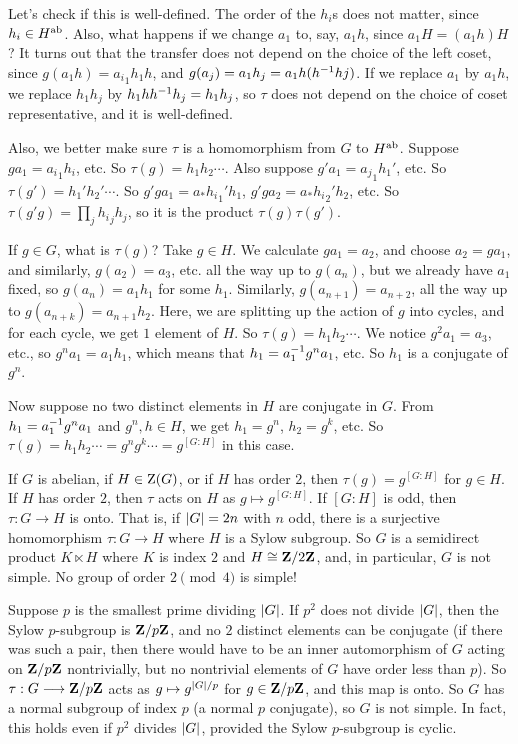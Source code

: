\documentclass[11pt, oneside]{amsart}
\begin{document}
Let's check if this is well-defined. The order of the $h_i$s does not matter, since $h_i\in H\textsuperscript{ab}$. Also, what happens if we change $a_1$ to, say, $a_1h$, since $a_1H = (a_1h)H$? It turns out that the transfer does not depend on the choice of the left coset, since $g(a_1h) = {a_i}_1 h_1h$, and $g(a_j) = a_1 h_j = a_1h(h^{-1} hj)$. If we replace $a_1$ by $a_1h$, we replace $h_1h_j$ by $h_1hh^{-1} h_j = h_1h_j$, so $\tau$ does not depend on the choice of coset representative, and it is well-defined.

Also, we better make sure $\tau$ is a homomorphism from $G$ to $H\textsuperscript{ab}$. Suppose $ga_1 = {a_i}_1h_i$, etc. So $\tau(g) = h_1h_2\cdots$. Also suppose $g'a_1 = {a_j}_1h_1'$, etc. So $\tau(g') = h_1'h_2'\cdots$. So $g'ga_1 = a_* {h_i}_1' h_1$, $g'ga_2 = a_* {h_i}_2' h_2$, etc. So $\tau(g'g)= \prod_j {h_i}_j h_j$, so it is the product $\tau(g)\tau(g')$.

If $g\in G$, what is $\tau(g)$? Take $g\in H$. We calculate $ga_1=a_2$, and choose $a_2 =ga_1$, and similarly, $g(a_2) = a_3$, etc. all the way up to $g(a_n)$, but we already have $a_1$ fixed, so $g(a_n)=a_1h_1$ for some $h_1$. Similarly, $g(a_{n+1}) = a_{n+2}$, all the way up to $g(a_{n+k}) = a_{n+1} h_2$. Here, we are splitting up the action of $g$ into cycles, and for each cycle, we get $1$ element of $H$. So $\tau(g) = h_1h_2\cdots$. We notice $g^2a_1 = a_3$, etc., so $g^na_1 =  a_1h_1$, which means that $h_1 = a_1^{-1} g^na_1$, etc. So $h_1$ is a conjugate of $g^n$. 

Now suppose no two distinct elements in $H$ are conjugate in $G$. From $h_1 = a_1^{-1} g^na_1$ and $g^n,h\in H$, we get $h_1 = g^n$, $h_2 = g^k$, etc. So $\tau(g) = h_1h_2\cdots = g^ng^k\cdots = g^{[G:H]}$ in this case.

If $G$ is abelian, if $H\in \operatorname{Z}(G)$, or if $H$ has order $2$, then $\tau(g) = g^{[G:H]}$ for $g\in H$. If $H$ has order $2$, then $\tau$ acts on $H$ as  $g\mapsto g^{[G:H]}$. If $[G:H]$ is odd, then $\tau : G\longrightarrow H$ is onto. That is, if $\left \lvert G \right \rvert= 2n$ with $n$ odd, there is a surjective homomorphism $\tau : G\longrightarrow H$ where $H$ is a Sylow subgroup. So $G$ is a semidirect product $K\ltimes H$ where $K$ is index $2$ and $H\cong \mathbf Z / 2\mathbf Z$, and, in particular, $G$ is not simple. No group of order $2\pmod 4$ is simple! 

Suppose $p$ is the smallest prime dividing $\left \lvert G \right \rvert$. If $p^2$ does not divide $\left \lvert G \right \rvert$, then the Sylow $p$-subgroup is $\mathbf Z / p\mathbf Z$, and no $2$ distinct elements can be conjugate (if there was such a pair, then there would have to be an inner automorphism of $G$ acting on $\mathbf Z / p\mathbf Z$ nontrivially, but no nontrivial elements of $G$ have order less than $p$). So $\tau : G\longrightarrow \mathbf Z / p\mathbf Z$ acts as $g\mapsto g^{\left \lvert G \right \rvert /p}$ for $g\in \mathbf Z / p\mathbf Z$, and this map is onto. So $G$ has a normal subgroup of index $p$ (a normal $p$ conjugate), so $G$ is not simple. In fact, this holds even if $p^2$ divides $\left \lvert G \right \rvert$, provided the Sylow $p$-subgroup is cyclic.
\end{document}
